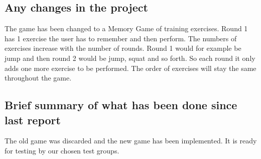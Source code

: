 \documentclass[12pt]{report}
\begin{document}
\subsection*{Any changes in the project}
The game has been changed to a Memory Game of training exercises. Round 1 has 1 exercise the user has to remember and then perform. The numbers of exercises increase with the number of rounds. Round 1 would for example be jump and then round 2 would be jump, squat and so forth. So each round it only adds one more exercise to be performed. The order of exercises will stay the same throughout the game.

\subsection*{Brief summary of what has been done since last report}
The old game was discarded and the new game has been implemented. It is ready for testing by our chosen test groups.
\end{document}
